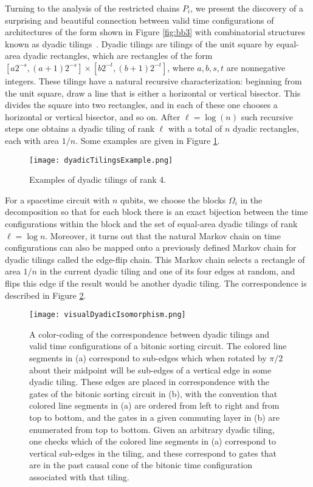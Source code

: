 \documentclass[11pt,letterpaper]{article}
\theoremstyle{definition}
\theoremstyle{remark}
\numberwithin{equation}{section}
\theoremstyle{definition}
\begin{document}
Turning to the analysis of the restricted chains $P_i$, we present the discovery of a surprising and beautiful connection between valid time configurations of architectures of the form shown in Figure \ref{fig:bb3} with combinatorial structures known as dyadic tilings~\cite{randomdyadictilingsoftheunitsquare}.  Dyadic tilings are tilings of the unit square by equal-area dyadic rectangles, which are rectangles of the form $[a 2^{-s}, (a+1)2^{-s}]\times [b 2^{-t},(b+1) 2^{-t}]$, where $a,b,s,t$ are nonnegative integers.  These tilings have a natural recursive characterization: beginning from the unit square, draw a line that is either a horizontal or vertical bisector.  This divides the square into two rectangles, and in each of these one chooses a horizontal or vertical bisector, and so on.  After $\ell = \log(n)$ such recursive steps one obtains a dyadic tiling of rank $\ell$ with a total of $n$ dyadic rectangles, each with area $1/n$. Some examples are given in Figure \ref{fig:dyadicex_intro}.
\begin{figure}[h!]
\begin{center}
\texttt{[image: dyadicTilingsExample.png]}
\caption{Examples of dyadic tilings of rank 4. \label{fig:dyadicex_intro}}
\end{center}
\end{figure}

For a spacetime circuit with $n$ qubits, we choose the blocks $\Omega_i$ in the decomposition so that for each block there is an exact bijection between the time configurations within the block and the set of equal-area dyadic tilings of rank $\ell = \log n$.  Moreover, it turns out that the natural Markov chain on time configurations can also be mapped onto a previously defined Markov chain for dyadic tilings called the edge-flip chain.  This Markov chain selects a rectangle of area $1/n$ in the current dyadic tiling and one of its four edges at random, and flips this edge if the result would be another dyadic tiling. The correspondence is described in Figure \ref{fig:vdi2}.
\begin{figure}[h!]
\begin{center}
\texttt{[image: visualDyadicIsomorphism.png]}
\end{center}
\caption{A color-coding of the correspondence between dyadic tilings and valid time configurations of a bitonic sorting circuit.  The colored line segments in (a) correspond to sub-edges which when rotated by $\pi/2$ about their midpoint will be sub-edges of a vertical edge in some dyadic tiling.  These edges are placed in correspondence with the gates of the bitonic sorting circuit in (b), with the convention that colored line segments in (a) are ordered from left to right and from top to bottom, and the gates in a given commuting layer in (b) are enumerated from top to bottom.  Given an arbitrary dyadic tiling, one checks which of the colored line segments in (a) correspond to vertical sub-edges in the tiling, and these correspond to gates that are in the past causal cone of the bitonic time configuration associated with that tiling. \label{fig:vdi2}}
\end{figure}
\end{document}

